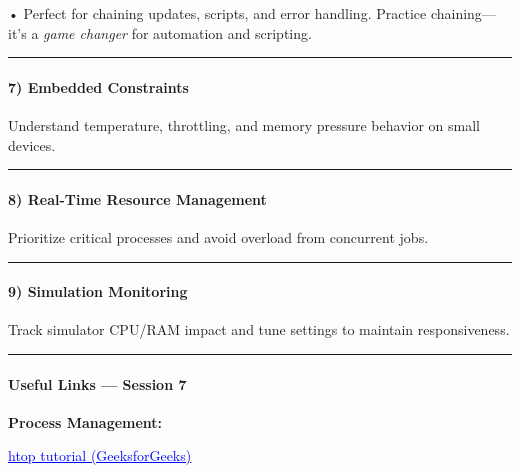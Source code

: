 \documentclass[
  english,
  paper=a4,
  oneside  ,captions=tableheading
]{scrartcl}
\begin{document}
• Perfect for chaining updates, scripts, and error handling. Practice
chaining---it's a \emph{game changer} for automation and scripting.

\begin{center}\rule{0.5\linewidth}{0.5pt}\end{center}

\paragraph{7) Embedded Constraints}\label{embedded-constraints}

Understand temperature, throttling, and memory pressure behavior on
small devices.

\begin{center}\rule{0.5\linewidth}{0.5pt}\end{center}

\paragraph{8) Real-Time Resource
Management}\label{real-time-resource-management}

Prioritize critical processes and avoid overload from concurrent jobs.

\begin{center}\rule{0.5\linewidth}{0.5pt}\end{center}

\paragraph{9) Simulation Monitoring}\label{simulation-monitoring}

Track simulator CPU/RAM impact and tune settings to maintain
responsiveness.

\begin{center}\rule{0.5\linewidth}{0.5pt}\end{center}

\paragraph{Useful Links --- Session 7}\label{useful-links-session-7}

\textbf{Process Management:}

%
  \par\vspace{0.5ex}%
  \href{https://www.geeksforgeeks.org/linux-unix/using-htop-to-monitor-system-processes-on-linux/}{\textcolor{blue}{\underline{\faLink\quad htop tutorial (GeeksforGeeks)}}}%
  \par\vspace{0.5ex}%
\end{document}
